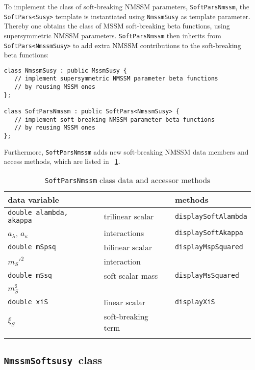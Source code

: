 \documentclass[final,3p,times,pdflatex]{elsarticle}
\def\code#1{\small{\tt #1}\normalsize}
\begin{document}
To implement the class of soft-breaking NMSSM parameters,
\code{SoftParsNmssm}, the \code{SoftPars<Susy>} template is
instantiated using \code{NmssmSusy} as template parameter.  Thereby
one obtains the class of MSSM soft-breaking beta functions, using
supersymmetric NMSSM parameters.  \code{SoftParsNmssm} then inherits
from \code{SoftPars<NmssmSusy>} to add extra NMSSM contributions to
the soft-breaking beta functions:
%
\begin{verbatim}
class NmssmSusy : public MssmSusy {
   // implement supersymmetric NMSSM parameter beta functions
   // by reusing MSSM ones
};

class SoftParsNmssm : public SoftPars<NmssmSusy> {
   // implement soft-breaking NMSSM parameter beta functions
   // by reusing MSSM ones
};
\end{verbatim}
%
Furthermore, \code{SoftParsNmssm} adds new soft-breaking NMSSM data
members and access methods, which are listed in
\tablename~\ref{tab:nmssmsoftpars}.
%
\begin{table}
  \centering
  \begin{tabular}{lll}
    data variable & & methods \\\hline
    \code{\small double alambda, akappa} & trilinear scalar &
    \code{\small displaySoftAlambda}
    \\
    $a_\lambda$, $a_\kappa$ & interactions & \code{\small displaySoftAkappa}
    \\\hline
    \code{\small double mSpsq} & bilinear scalar &
    \code{\small displayMspSquared}
    \\
    $m_{S}'^2$ & interaction &
    \\\hline
    \code{\small double mSsq} & soft scalar mass &
    \code{\small displayMsSquared}
    \\
    $m_S^2$ & &
    \\\hline
    \code{\small double xiS} & linear scalar &
    \code{\small displayXiS}
    \\
    $\xi_S$ & soft-breaking term &
    \\\hline
    \normalsize
  \end{tabular}
  \caption{\code{SoftParsNmssm} class data and accessor methods
    \label{tab:nmssmsoftpars}}
\end{table}

\subsection{\code{NmssmSoftsusy}~class}
\label{nmssmsoftsusy}
\end{document}
